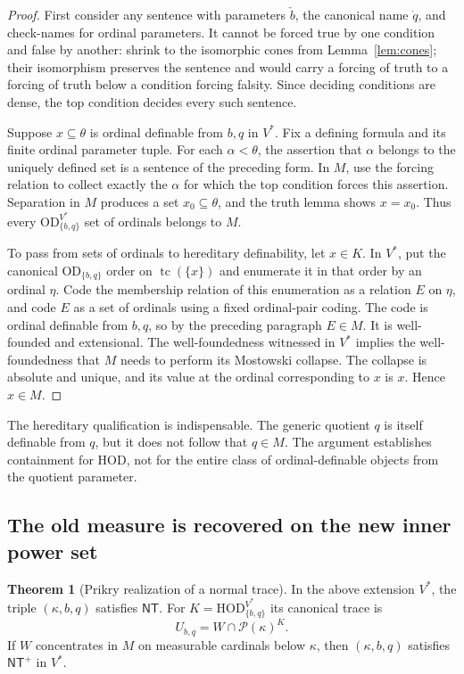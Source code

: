 \documentclass[11pt,letterpaper]{article}
\theoremstyle{definition}
\newtheorem{theorem}[definition]{Theorem}
\numberwithin{equation}{section}
\newcommand{\HOD}{\mathrm{HOD}}
\newcommand{\OD}{\mathrm{OD}}
\newcommand{\Pow}{\mathcal P}
\newcommand{\tc}{\operatorname{tc}}
\newcommand{\NT}{\mathsf{NT}}
\newcommand{\NTP}{\mathsf{NT}^{+}}
\begin{document}
\begin{proof}
First consider any sentence with parameters $\check b$, the canonical
name $\dot q$, and check-names for ordinal parameters. It cannot be
forced true by one condition and false by another: shrink to the
isomorphic cones from Lemma~\ref{lem:cones}; their isomorphism preserves
the sentence and would carry a forcing of truth to a forcing of truth
below a condition forcing falsity. Since deciding conditions are dense,
the top condition decides every such sentence.

Suppose $x\subseteq\theta$ is ordinal definable from $b,q$ in $V^*$.
Fix a defining formula and its finite ordinal parameter tuple. For
each $\alpha<\theta$, the assertion that $\alpha$ belongs to the uniquely
defined set is a sentence of the preceding form. In $M$, use the
forcing relation to collect exactly the $\alpha$ for which the top
condition forces this assertion. Separation in $M$ produces a set
$x_0\subseteq\theta$, and the truth lemma shows $x=x_0$. Thus every
$\OD_{\{b,q\}}^{V^*}$ set of ordinals belongs to $M$.

To pass from sets of ordinals to hereditary definability, let $x\in K$.
In $V^*$, put the canonical $\OD_{\{b,q\}}$ order on $\tc(\{x\})$
and enumerate it in that order by an ordinal $\eta$. Code the membership
relation of this enumeration as a relation $E$ on $\eta$, and code $E$
as a set of ordinals using a fixed ordinal-pair coding. The code is
ordinal definable from $b,q$, so by the preceding paragraph $E\in M$.
It is well-founded and extensional. The well-foundedness witnessed in
$V^*$ implies the well-foundedness that $M$ needs to perform its
Mostowski collapse. The collapse is absolute and unique, and its value
at the ordinal corresponding to $x$ is $x$. Hence $x\in M$.
\end{proof}

The hereditary qualification is indispensable. The generic quotient
$q$ is itself definable from $q$, but it does not follow that $q\in M$.
The argument establishes containment for HOD, not for the entire class
of ordinal-definable objects from the quotient parameter.

\subsection{The old measure is recovered on the new inner power set}

\begin{theorem}[Prikry realization of a normal trace]\label{thm:realization}
In the above extension $V^*$, the triple $(\kappa,b,q)$ satisfies
$\NT$. For $K=\HOD_{\{b,q\}}^{V^*}$ its canonical trace is
\begin{equation}\label{eq:restriction}
 U_{b,q}=W\cap\Pow(\kappa)^K.
\end{equation}
If $W$ concentrates in $M$ on measurable cardinals below $\kappa$,
then $(\kappa,b,q)$ satisfies $\NTP$ in $V^*$.
\end{theorem}
\end{document}
